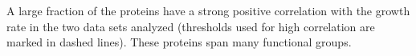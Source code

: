 
A large fraction of the proteins have a strong positive correlation with the growth rate in the two data sets analyzed (thresholds used for high correlation are marked in dashed lines).
These proteins span many functional groups.
